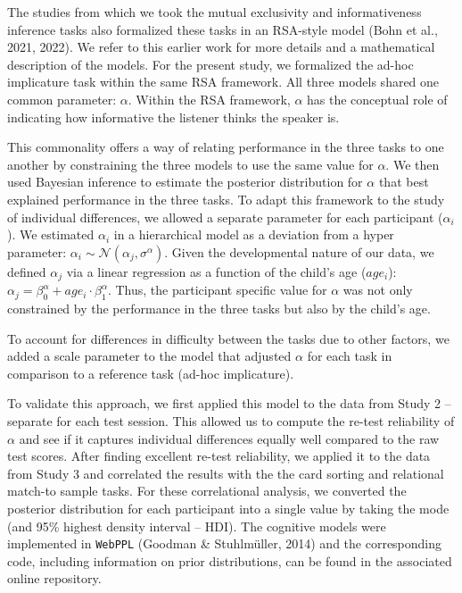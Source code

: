 \documentclass[
  english,
  man,floatsintext]{apa6}
\begin{document}
The studies from which we took the mutual exclusivity and informativeness inference tasks also formalized these tasks in an RSA-style model (Bohn et al., 2021, 2022). We refer to this earlier work for more details and a mathematical description of the models. For the present study, we formalized the ad-hoc implicature task within the same RSA framework. All three models shared one common parameter: \(\alpha\). Within the RSA framework, \(\alpha\) has the conceptual role of indicating how informative the listener thinks the speaker is.

This commonality offers a way of relating performance in the three tasks to one another by constraining the three models to use the same value for \(\alpha\). We then used Bayesian inference to estimate the posterior distribution for \(\alpha\) that best explained performance in the three tasks. To adapt this framework to the study of individual differences, we allowed a separate parameter for each participant (\(\alpha_i\)). We estimated \(\alpha_i\) in a hierarchical model as a deviation from a hyper parameter: \(\alpha_i \sim \mathcal{N}(\alpha_j, \sigma^\alpha)\). Given the developmental nature of our data, we defined \(\alpha_j\) via a linear regression as a function of the child's age (\(age_i\)): \(\alpha_j = \beta^\alpha_0 + age_i \cdot \beta^\alpha_1\). Thus, the participant specific value for \(\alpha\) was not only constrained by the performance in the three tasks but also by the child's age.

To account for differences in difficulty between the tasks due to other factors, we added a scale parameter to the model that adjusted \(\alpha\) for each task in comparison to a reference task (ad-hoc implicature).

To validate this approach, we first applied this model to the data from Study 2 -- separate for each test session. This allowed us to compute the re-test reliability of \(\alpha\) and see if it captures individual differences equally well compared to the raw test scores. After finding excellent re-test reliability, we applied it to the data from Study 3 and correlated the results with the the card sorting and relational match-to sample tasks. For these correlational analysis, we converted the posterior distribution for each participant into a single value by taking the mode (and 95\% highest density interval -- HDI). The cognitive models were implemented in \texttt{WebPPL} (Goodman \& Stuhlmüller, 2014) and the corresponding code, including information on prior distributions, can be found in the associated online repository.
\end{document}
